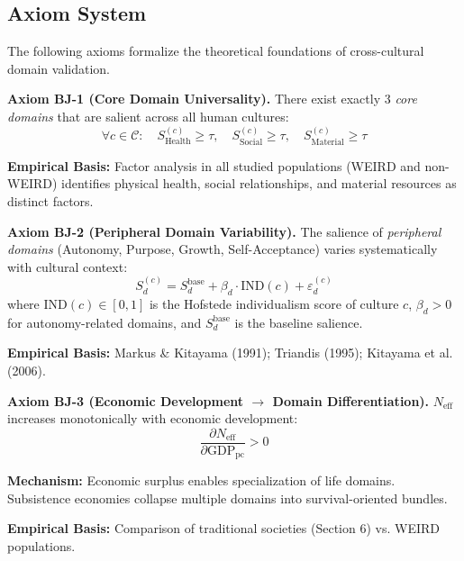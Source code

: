 \subsection{Axiom System}

The following axioms formalize the theoretical foundations of cross-cultural domain validation.

\begin{tcolorbox}[colback=red!5!white, colframe=red!75!black, title=Axiom BJ-1: Core Domain Universality]
\textbf{Axiom BJ-1 (Core Domain Universality).}
There exist exactly 3 \textit{core domains} that are salient across all human cultures:
\begin{equation}
\forall c \in \mathcal{C}: \quad S_{\text{Health}}^{(c)} \geq \tau, \quad S_{\text{Social}}^{(c)} \geq \tau, \quad S_{\text{Material}}^{(c)} \geq \tau
\end{equation}

\textbf{Empirical Basis:} Factor analysis in all studied populations (WEIRD and non-WEIRD) identifies
physical health, social relationships, and material resources as distinct factors.
\end{tcolorbox}

\begin{tcolorbox}[colback=red!5!white, colframe=red!75!black, title=Axiom BJ-2: Peripheral Domain Variability]
\textbf{Axiom BJ-2 (Peripheral Domain Variability).}
The salience of \textit{peripheral domains} (Autonomy, Purpose, Growth, Self-Acceptance)
varies systematically with cultural context:
\begin{equation}
S_d^{(c)} = S_d^{\text{base}} + \beta_d \cdot \text{IND}(c) + \varepsilon_d^{(c)}
\end{equation}
where $\text{IND}(c) \in [0,1]$ is the Hofstede individualism score of culture $c$,
$\beta_d > 0$ for autonomy-related domains, and $S_d^{\text{base}}$ is the baseline salience.

\textbf{Empirical Basis:} Markus \& Kitayama (1991); Triandis (1995); Kitayama et al. (2006).
\end{tcolorbox}

\begin{tcolorbox}[colback=red!5!white, colframe=red!75!black, title=Axiom BJ-3: Domain Differentiation Gradient]
\textbf{Axiom BJ-3 (Economic Development $\rightarrow$ Domain Differentiation).}
$N_{\text{eff}}$ increases monotonically with economic development:
\begin{equation}
\frac{\partial N_{\text{eff}}}{\partial \text{GDP}_{\text{pc}}} > 0
\end{equation}

\textbf{Mechanism:} Economic surplus enables specialization of life domains. Subsistence economies
collapse multiple domains into survival-oriented bundles.

\textbf{Empirical Basis:} Comparison of traditional societies (Section 6) vs. WEIRD populations.
\end{tcolorbox}

